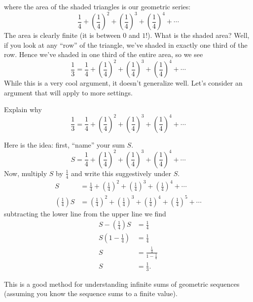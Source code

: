 \documentclass{ximera}
\begin{document}
where the area of the shaded triangles is our geometric series:
\[
\frac{1}{4} + \left(\frac{1}{4}\right)^2 + \left(\frac{1}{4}\right)^3 + \left(\frac{1}{4}\right)^4 + \cdots 
\]
The area is clearly finite (it is between $0$ and $1$!). What is the
shaded area? Well, if you look at any ``row'' of the triangle, we've
shaded in exactly one third of the row. Hence we've shaded in one third of
the entire area, so we see
\[
\frac{1}{3}=\frac{1}{4} + \left(\frac{1}{4}\right)^2 + \left(\frac{1}{4}\right)^3 + \left(\frac{1}{4}\right)^4 + \cdots 
\]
While this is a very cool argument, it doesn't generalize well. Let's consider
 an argument that will apply to more settings.

\begin{example}
  Explain why
  \[
  \frac{1}{3}=\frac{1}{4} + \left(\frac{1}{4}\right)^2 + \left(\frac{1}{4}\right)^3 + \left(\frac{1}{4}\right)^4 + \cdots 
  \]
  \begin{explanation}
    Here is the idea: first, ``name'' your sum $S$.
    \[
    S = \frac{1}{4} + \left(\frac{1}{4}\right)^2 + \left(\frac{1}{4}\right)^3 + \left(\frac{1}{4}\right)^4 + \cdots 
    \]
    Now, multiply $S$ by $\frac{1}{4}$ and write this suggestively under $S$.
    \begin{align*}
      S &= \frac{1}{4} + \left(\frac{1}{4}\right)^2 + \left(\frac{1}{4}\right)^3 + \left(\frac{1}{4}\right)^4 + \cdots\\
     \left(\frac{1}{4}\right)S &=   \left(\frac{1}{4}\right)^2 + \left(\frac{1}{4}\right)^3 + \left(\frac{1}{4}\right)^4 + \left(\frac{1}{4}\right)^5+ \cdots
    \end{align*}
    subtracting the lower line from the upper line we find
    \begin{align*}
      S - \left(\frac{1}{4}\right)S &=  \frac{1}{4}\\
      S(1-\frac{1}{4}) &= \frac{1}{4}\\
      S &= \frac{\frac{1}{4}}{1-\frac{1}{4}}\\
      S &= \frac{1}{3}.
    \end{align*}
  \end{explanation}
\end{example}

This is a good method for understanding infinite sums of geometric
sequences (assuming you know the sequence sums to a finite value).
\end{document}
